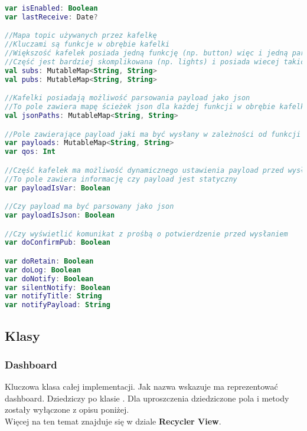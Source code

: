 \begin{lstlisting}[language=Kotlin]
var isEnabled: Boolean
var lastReceive: Date?

//Mapa topic używanych przez kafelkę
//Kluczami są funkcje w obrębie kafelki
//Większość kafelek posiada jedną funkcję (np. button) więc i jedną parę topic
//Część jest bardziej skomplikowana (np. lights) i posiada wiecej takich par
val subs: MutableMap<String, String>
val pubs: MutableMap<String, String>

//Kafelki posiadają możliwość parsowania payload jako json
//To pole zawiera mapę ścieżek json dla każdej funkcji w obrębie kafelki
val jsonPaths: MutableMap<String, String>

//Pole zawierające payload jaki ma być wysłany w zależności od funkcji kafelki
var payloads: MutableMap<String, String>
var qos: Int

//Część kafelek ma możliwość dynamicznego ustawienia payload przed wysłaniem
//To pole zawiera informację czy payload jest statyczny
var payloadIsVar: Boolean

//Czy payload ma być parsowany jako json
var payloadIsJson: Boolean

//Czy wyświetlić komunikat z prośbą o potwierdzenie przed wysłaniem
var doConfirmPub: Boolean

var doRetain: Boolean
var doLog: Boolean
var doNotify: Boolean
var silentNotify: Boolean
var notifyTitle: String
var notifyPayload: String
\end{lstlisting}

\newpage

\subsection{Klasy}
\subsubsection{Dashboard}
Kluczowa klasa całej implementacji. Jak nazwa wskazuje ma reprezentować dashboard. Dziedziczy po klasie . Dla uproszczenia dziedziczone pola i metody zostały wyłączone z opisu poniżej.\\
Więcej na ten temat znajduje się w dziale \textbf{Recycler View}.\\

